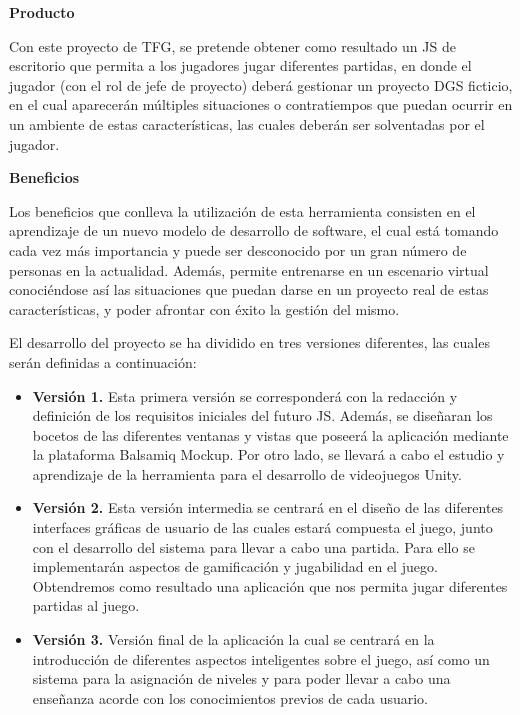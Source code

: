 \textbf{Producto}

Con este proyecto de TFG, se pretende obtener como resultado un JS de escritorio que permita a los jugadores jugar diferentes partidas, en donde el jugador (con el rol de jefe de proyecto) deberá gestionar un proyecto DGS ficticio, en el cual aparecerán múltiples situaciones o contratiempos que puedan ocurrir en un ambiente de estas características, las cuales deberán ser solventadas por el jugador.

\textbf{Beneficios}

Los beneficios que conlleva la utilización de esta herramienta consisten en el aprendizaje de un nuevo modelo de desarrollo de software, el cual está tomando cada vez más importancia y puede ser desconocido por un gran número de personas en la actualidad. Además, permite entrenarse en un escenario virtual conociéndose así las situaciones que puedan darse en un proyecto real de estas características, y poder afrontar con éxito la gestión del mismo.

El desarrollo del proyecto se ha dividido en tres versiones diferentes, las cuales serán definidas a continuación:

\begin{itemize}
	\item \textbf{Versión 1.} Esta primera versión se corresponderá con la redacción y definición de los requisitos iniciales del futuro JS. Además, se diseñaran los bocetos de las diferentes ventanas y vistas que poseerá la aplicación mediante la plataforma Balsamiq Mockup. Por otro lado, se llevará a cabo el estudio y aprendizaje de la herramienta para el desarrollo de videojuegos Unity.
	\item \textbf{Versión 2.} Esta versión intermedia se centrará en el diseño de las diferentes interfaces gráficas de usuario de las cuales estará compuesta el juego, junto con el desarrollo del sistema para llevar a cabo una partida. Para ello se implementarán aspectos de gamificación y jugabilidad en el juego. Obtendremos como resultado una aplicación que nos permita jugar diferentes partidas al juego.
	\item \textbf{Versión 3.} Versión final de la aplicación la cual se centrará en la introducción de diferentes aspectos inteligentes sobre el juego, así como un sistema para la asignación de niveles y para poder llevar a cabo una enseñanza acorde con los conocimientos previos de cada usuario.
\end{itemize}